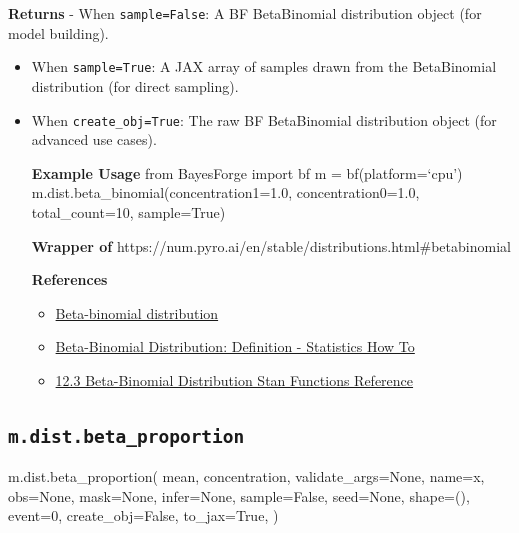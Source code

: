 \documentclass[
  letterpaper,
  DIV=11,
  numbers=noendperiod]{scrartcl}
\newenvironment{Shaded}{\begin{snugshade}}{\end{snugshade}}
\newcommand{\DecValTok}[1]{\textcolor[rgb]{0.68,0.00,0.00}{#1}}
\newcommand{\NormalTok}[1]{\textcolor[rgb]{0.00,0.23,0.31}{#1}}
\newcommand{\OperatorTok}[1]{\textcolor[rgb]{0.37,0.37,0.37}{#1}}
\newcommand{\StringTok}[1]{\textcolor[rgb]{0.13,0.47,0.30}{#1}}
\newcommand{\VariableTok}[1]{\textcolor[rgb]{0.07,0.07,0.07}{#1}}
\providecommand{\tightlist}{%
  \setlength{\itemsep}{0pt}\setlength{\parskip}{0pt}}\usepackage{longtable,booktabs,array}
\begin{document}
\textbf{Returns} - When \texttt{sample=False}: A BF BetaBinomial
distribution object (for model building).

\begin{itemize}
\item
  When \texttt{sample=True}: A JAX array of samples drawn from the
  BetaBinomial distribution (for direct sampling).
\item
  When \texttt{create\_obj=True}: The raw BF BetaBinomial distribution
  object (for advanced use cases).

  \textbf{Example Usage} from BayesForge import bf m =
  bf(platform=`cpu') m.dist.beta\_binomial(concentration1=1.0,
  concentration0=1.0, total\_count=10, sample=True)

  \textbf{Wrapper of}
  https://num.pyro.ai/en/stable/distributions.html\#betabinomial

  \textbf{References}

  \begin{itemize}
  \tightlist
  \item
    \href{https://en.wikipedia.org/wiki/Beta-binomial_distribution}{Beta-binomial
    distribution}
  \item
    \href{https://www.statisticshowto.com/beta-binomial-distribution/}{Beta-Binomial
    Distribution: Definition - Statistics How To}
  \item
    \href{https://mc-stan.org/docs/2_19/functions-reference/beta-binomial-distribution.html}{12.3
    Beta-Binomial Distribution \textbar{} Stan Functions Reference}
  \end{itemize}
\end{itemize}

\subsection{\texorpdfstring{\texttt{m.dist.beta\_proportion}}{m.dist.beta\_proportion}}\label{beta_proportion}

\begin{Shaded}
\begin{Highlighting}[]
\NormalTok{m.dist.beta\_proportion(}
\NormalTok{    mean,}
\NormalTok{    concentration,}
\NormalTok{    validate\_args}\OperatorTok{=}\VariableTok{None}\NormalTok{,}
\NormalTok{    name}\OperatorTok{=}\StringTok{\textquotesingle{}x\textquotesingle{}}\NormalTok{,}
\NormalTok{    obs}\OperatorTok{=}\VariableTok{None}\NormalTok{,}
\NormalTok{    mask}\OperatorTok{=}\VariableTok{None}\NormalTok{,}
\NormalTok{    infer}\OperatorTok{=}\VariableTok{None}\NormalTok{,}
\NormalTok{    sample}\OperatorTok{=}\VariableTok{False}\NormalTok{,}
\NormalTok{    seed}\OperatorTok{=}\VariableTok{None}\NormalTok{,}
\NormalTok{    shape}\OperatorTok{=}\NormalTok{(),}
\NormalTok{    event}\OperatorTok{=}\DecValTok{0}\NormalTok{,}
\NormalTok{    create\_obj}\OperatorTok{=}\VariableTok{False}\NormalTok{,}
\NormalTok{    to\_jax}\OperatorTok{=}\VariableTok{True}\NormalTok{,}
\NormalTok{)}
\end{Highlighting}
\end{Shaded}
\end{document}

